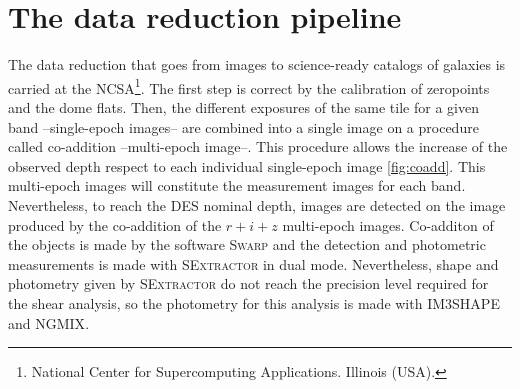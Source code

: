\section{The data reduction pipeline}
The data reduction that goes from images to science-ready catalogs of galaxies is carried at the NCSA\footnote{National Center for Supercomputing Applications. Illinois (USA).}. The first step is correct by the calibration of zeropoints and the dome flats. Then, the different exposures of the same tile for a given band --single-epoch images-- are combined into a single image on a procedure called co-addition --multi-epoch image--. This procedure allows the increase of the observed depth respect to each individual single-epoch image \autoref{fig:coadd}. This multi-epoch images will constitute the measurement images for each band. Nevertheless, to reach the DES nominal depth, images are detected on the image produced by the co-addition of the $r+i+z$ multi-epoch images. Co-additon of the objects is made by the software {\scshape Swarp} and the detection and photometric measurements is made with {\scshape SExtractor} in dual mode. Nevertheless, shape and photometry given by {\scshape SExtractor} do not reach the precision level required for the shear analysis, so the photometry for this analysis is made with {\scshape IM3SHAPE} and {\scshape NGMIX}.
